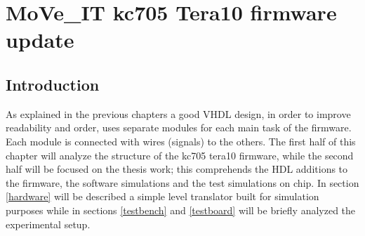 \chapter{MoVe\_IT kc705 Tera10 firmware update}
\section{Introduction}
\noindent As explained in the previous chapters a good VHDL design, in order to improve readability and order, uses separate modules for each main task of the firmware. Each module is connected with wires (signals) to the others. The first half of this chapter will analyze the structure of the kc705 tera10 firmware, while the second half will be focused on the thesis work; this comprehends the HDL additions to the firmware, the software simulations and the test simulations on chip.
In section \ref{hardware} will be described a simple level translator built for simulation purposes while in sections \ref{testbench} and \ref{testboard} will be briefly analyzed the experimental setup.

